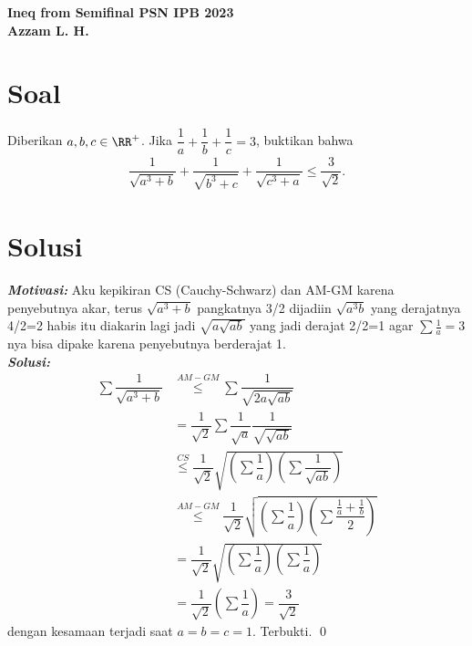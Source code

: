 \begin{center}
    \textbf{\Huge Ineq from Semifinal PSN IPB 2023}\\
    \textbf{\large Azzam L. H.}
\end{center}


\section{Soal}
Diberikan $a,b,c \in \RR^+$. Jika $\dfrac{1}{a}+\dfrac{1}{b}+\dfrac{1}{c}=3$, buktikan bahwa
\begin{align*}
    \dfrac{1}{\sqrt{a^3+b}}+\dfrac{1}{\sqrt{b^3+c}}+\dfrac{1}{\sqrt{c^3+a}} \le \dfrac{3}{\sqrt{2}}.
\end{align*}

\newpage
\section{Solusi}
\textit{\textbf{Motivasi: }} Aku kepikiran CS (Cauchy-Schwarz) dan AM-GM karena penyebutnya akar, terus $\sqrt{a^3+b}$ pangkatnya 3/2 dijadiin $\sqrt{a^3b}$  yang derajatnya 4/2=2 habis itu diakarin lagi jadi $\sqrt{a\sqrt{ab}}$ yang jadi derajat 2/2=1 agar $\sum \frac{1}{a} = 3$ nya bisa dipake karena penyebutnya berderajat 1.\\
\textit{\textbf{Solusi:}}
\begin{align*}
    \sum \dfrac{1}{\sqrt{a^3+b}}
    &\overset{AM-GM}{\le}
    \sum\dfrac{1}{\sqrt{2a\sqrt{ab}}}\\
    &=
    \dfrac{1}{\sqrt{2}}\sum\dfrac{1}{\sqrt{a}}\dfrac{1}{\sqrt{\sqrt{{ab}}}}\\
    &\overset{CS}{\le}
    \dfrac{1}{\sqrt{2}}\sqrt{\left(\sum\dfrac{1}{a}\right)\left(\sum\dfrac{1}{\sqrt{ab}}\right)}\\
    &\overset{AM-GM}{\le}
    \dfrac{1}{\sqrt{2}}\sqrt{\left(\sum\dfrac{1}{a}\right)\left(\sum\dfrac{\frac{1}{a}+\frac{1}{b}}{2}\right)}\\
    &=
    \dfrac{1}{\sqrt{2}}\sqrt{\left(\sum\dfrac{1}{a}\right)\left(\sum\dfrac{1}{a}\right)}\\
    &=
    \dfrac{1}{\sqrt{2}}\left(\sum\dfrac{1}{a}\right)
    =
    \dfrac{3}{\sqrt{2}}
\end{align*}
dengan kesamaan terjadi saat $a=b=c=1$. Terbukti. \qed
